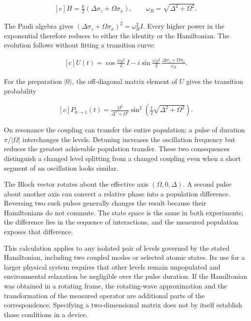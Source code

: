 \documentclass[11pt,oneside]{book}
\newenvironment{centeredalign}{\[\begin{gathered}[c]}{\end{gathered}\]}
\begin{document}
\begin{centeredalign}
H=\frac{\hbar}{2}(\Delta\sigma_z+\Omega\sigma_x),\qquad \omega_R=\sqrt{\Delta^2+\Omega^2}.
\end{centeredalign}

The Pauli algebra gives \((\Delta\sigma_z+\Omega\sigma_x)^2=\omega_R^2I\). Every higher power in the exponential therefore reduces to either the identity or the Hamiltonian. The evolution follows without fitting a transition curve:

\begin{centeredalign}
U(t)=\cos\frac{\omega_Rt}{2}\,I-i\sin\frac{\omega_Rt}{2}\,
\frac{\Delta\sigma_z+\Omega\sigma_x}{\omega_R}.
\end{centeredalign}

For the preparation \(|0\rangle\), the off-diagonal matrix element of \(U\) gives the transition probability

\begin{centeredalign}
P_{0\to1}(t)=\frac{\Omega^2}{\Delta^2+\Omega^2}
\sin^2\!\left(\frac{t}{2}\sqrt{\Delta^2+\Omega^2}\right).
\end{centeredalign}

On resonance the coupling can transfer the entire population; a pulse of duration \(\pi/|\Omega|\) interchanges the levels. Detuning increases the oscillation frequency but reduces the greatest achievable population transfer. These two consequences distinguish a changed level splitting from a changed coupling even when a short segment of an oscillation looks similar.

The Bloch vector rotates about the effective axis \((\Omega,0,\Delta)\). A second pulse about another axis can convert a relative phase into a population difference. Reversing two such pulses generally changes the result because their Hamiltonians do not commute. The state space is the same in both experiments; the difference lies in the sequence of interactions, and the measured population exposes that difference.

This calculation applies to any isolated pair of levels governed by the stated Hamiltonian, including two coupled modes or selected atomic states. Its use for a larger physical system requires that other levels remain unpopulated and environmental relaxation be negligible over the pulse duration. If the Hamiltonian was obtained in a rotating frame, the rotating-wave approximation and the transformation of the measured operator are additional parts of the correspondence. Specifying a two-dimensional matrix does not by itself establish those conditions in a device.
\end{document}
